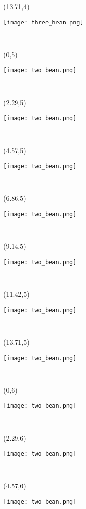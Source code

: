 \documentclass[a4paper]{article}
\newcommand{\myXthreeBean}[0]{
\texttt{[image: three\_bean.png]}
}
\newcommand{\myXtwoBean}[0]{
\texttt{[image: two\_bean.png]}
}
\newcommand{\mycard}[5]{%
	\tiny #1 #2
	\hspace{-0.75cm} \large#3\\
}
\begin{document}
\begin{textblock}{2.29}(13.71,4)
\mycard{}{}{
\myXthreeBean
}{}{} 
\end{textblock}


\begin{textblock}{2.29}(0,5)
\mycard{}{}{
\myXtwoBean
}{}{} 
\end{textblock}

\begin{textblock}{2.29}(2.29,5)
\mycard{}{}{
\myXtwoBean
}{}{} 
\end{textblock}

\begin{textblock}{2.29}(4.57,5)
\mycard{}{}{
\myXtwoBean
}{}{} 
\end{textblock}

\begin{textblock}{2.29}(6.86,5)
\mycard{}{}{
\myXtwoBean
}{}{} 
\end{textblock}

\begin{textblock}{2.29}(9.14,5)
\mycard{}{}{
\myXtwoBean
}{}{} 
\end{textblock}

\begin{textblock}{2.29}(11.42,5)
\mycard{}{}{
\myXtwoBean
}{}{} 
\end{textblock}

\begin{textblock}{2.29}(13.71,5)
\mycard{}{}{
\myXtwoBean
}{}{} 
\end{textblock}


\begin{textblock}{2.29}(0,6)
\mycard{}{}{
\myXtwoBean
}{}{} 
\end{textblock}

\begin{textblock}{2.29}(2.29,6)
\mycard{}{}{
\myXtwoBean
}{}{} 
\end{textblock}

\begin{textblock}{2.29}(4.57,6)
\mycard{}{}{
\myXtwoBean
}{}{} 
\end{textblock}
\end{document}

